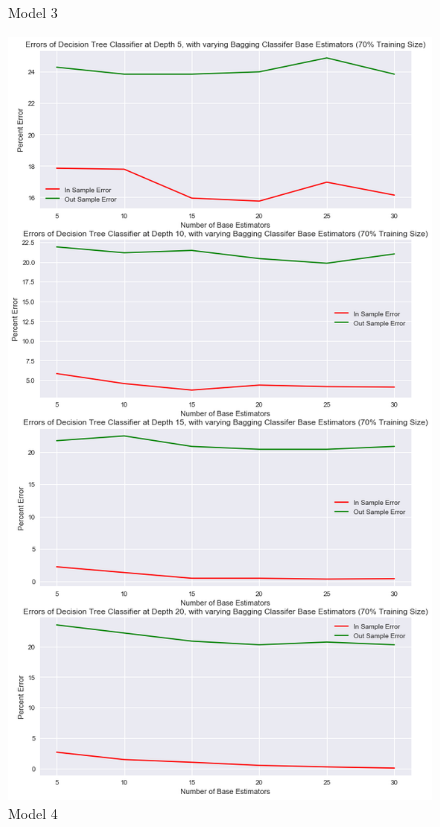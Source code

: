 \documentclass[10pt,twocolumn]{article}
\begin{document}
\begin{table}[ht]
\begin{figure}[!t]
  \caption{\small Model 3}
  \label{fig-1}
\end{figure}

\begin{figure}[!t]
  \begin{center}
    \includegraphics[width=\textwidth,height=\textheight,keepaspectratio]{decision_tree_bagging.png}
  \end{center}

  \caption{\small Model 4}
  \label{fig-1}
\end{figure}


\end{table}
\end{document}
